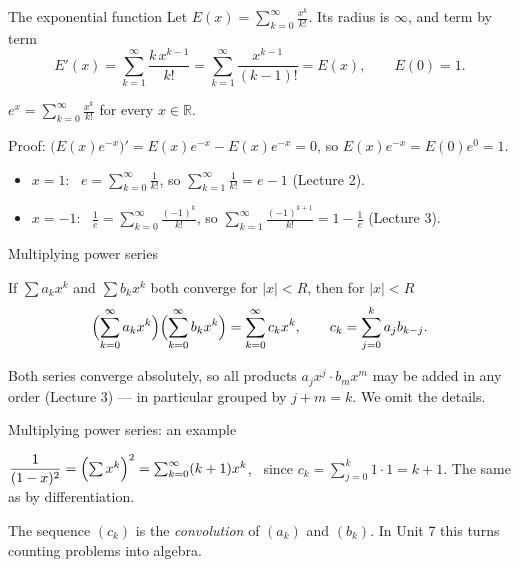 \documentclass[10pt]{wosm-slides}
\newcommand{\R}{\mathbb{R}}
\begin{document}
\begin{frame}{The exponential function}
  Let $E(x) = \sum_{k=0}^\infty \frac{x^k}{k!}$. Its radius is $\infty$, and term by term
  \[ E'(x) = \sum_{k=1}^\infty \frac{k\, x^{k-1}}{k!} = \sum_{k=1}^\infty \frac{x^{k-1}}{(k-1)!}
     = E(x), \qquad E(0) = 1 . \]
  \pause
  \begin{theorem}
    $e^x = \sum_{k=0}^\infty \frac{x^k}{k!}$ for every $x \in \R$.
  \end{theorem}
  {\small Proof: $\bigl(E(x) e^{-x}\bigr)' = E(x) e^{-x} - E(x) e^{-x} = 0$, so
  $E(x) e^{-x} = E(0) e^0 = 1$.\par}
  \pause
  \begin{itemize}
    \item $x = 1$: \ $e = \sum_{k=0}^\infty \frac{1}{k!}$, so $\sum_{k=1}^\infty \frac{1}{k!} = e - 1$
      (Lecture 2).
    \item $x = -1$: \ $\frac1e = \sum_{k=0}^\infty \frac{(-1)^k}{k!}$, so
      $\sum_{k=1}^\infty \frac{(-1)^{k+1}}{k!} = 1 - \frac1e$ (Lecture 3).
  \end{itemize}
\end{frame}

\begin{frame}{Multiplying power series}
  \begin{theorem}
    If $\sum a_k x^k$ and $\sum b_k x^k$ both converge for $|x| < R$, then for $|x| < R$
    \[ \Bigl(\sum_{k=0}^\infty a_k x^k\Bigr) \Bigl(\sum_{k=0}^\infty b_k x^k\Bigr)
       = \sum_{k=0}^\infty c_k x^k, \qquad c_k = \sum_{j=0}^{k} a_j b_{k-j} . \]
  \end{theorem}
  {\small Both series converge absolutely, so all products $a_j x^j \cdot b_m x^m$ may be added
  in any order (Lecture 3) --- in particular grouped by $j + m = k$. We omit the details.\par}
\end{frame}

\begin{frame}{Multiplying power series: an example}
  \begin{example}
    $\dfrac{1}{(1-x)^2} = \Bigl(\sum x^k\Bigr)^2 = \sum_{k=0}^\infty (k+1) x^k$, \ since
    $c_k = \sum_{j=0}^k 1 \cdot 1 = k + 1$. The same as by differentiation.
  \end{example}
  {\small The sequence $(c_k)$ is the \emph{convolution} of $(a_k)$ and $(b_k)$.
  In Unit 7 this turns counting problems into algebra.\par}
\end{frame}
\end{document}
